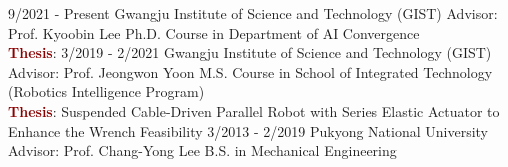 \documentclass[9pt]{developercv} %
\begin{document}
\vspace{-10 pt}
\begin{entrylist}
    \entry
		{9/2021 - Present}
		{Gwangju Institute of Science and Technology (GIST)}
		{Advisor: Prof. Kyoobin Lee}
		{Ph.D. Course in Department of AI Convergence \\
            \textcolor{darkred}{\textbf{Thesis}}: 
            }
	\entry
		{3/2019 - 2/2021}
		{Gwangju Institute of Science and Technology (GIST)}
		{Advisor: Prof. Jeongwon Yoon}
		{M.S. Course in School of Integrated Technology (Robotics Intelligence Program) \\
            \textcolor{darkred}{\textbf{Thesis}}: Suspended Cable-Driven Parallel Robot with Series Elastic Actuator to Enhance the Wrench Feasibility}
	\entry
		{3/2013 - 2/2019}
		{Pukyong National University}
		{Advisor: Prof. Chang-Yong Lee}
		{B.S. in Mechanical Engineering}       
\end{entrylist}
\end{document}
